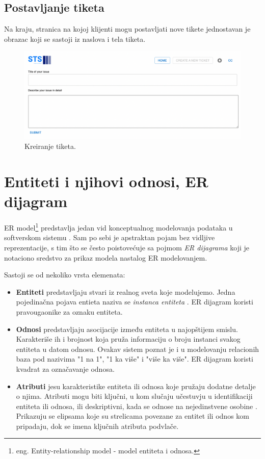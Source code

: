 \documentclass[12pt,oneside]{memoir}
\begin{document}
\newpage
\subsection{Postavljanje tiketa}

Na kraju, stranica na kojoj klijenti mogu postavljati nove tikete jednostavan je obrazac koji se sastoji iz naslova i tela tiketa.

\begin{figure}[h]
  \centering
  \includegraphics[width=1\textwidth]{docs/images/ch_1/ticket-new.png} 
  \caption{Kreiranje tiketa.}
\end{figure}

\newpage
\section{Entiteti i njihovi odnosi, ER dijagram}

ER model\footnote{eng. Entity-relationship model - model entiteta i odnosa.} predstavlja jedan vid konceptualnog modelovanja podataka u softverskom sistemu \cite{dbmodelinganddesign}. Sam po sebi je apstraktan pojam bez vidljive reprezentacije, s tim što se često poistovećuje sa pojmom \textit{ER dijagrama} koji je notaciono sredstvo za prikaz modela nastalog ER modelovanjem.

Sastoji se od nekoliko vrsta elemenata:
\begin{itemize}
    \item \textbf{Entiteti} predstavljaju stvari iz realnog sveta koje modelujemo. Jedna pojedinačna pojava entieta naziva se \textit{instanca entiteta} \cite{dbmodelinganddesign}. ER dijagram koristi pravougaonike za oznaku entiteta.
    \item \textbf{Odnosi} predstavljaju asocijacije između entiteta u najopštijem smislu. Karakteriše ih i brojnost koja pruža informaciju o broju instanci svakog entiteta u datom odnosu. Ovakav sistem poznat je i u modelovanju relacionih baza pod nazivima "1 na 1", "1 ka više" i "više ka više". ER dijagram koristi kvadrat za označavanje odnosa.
    \item \textbf{Atributi} jesu karakteristike entiteta ili odnosa koje pružaju dodatne detalje o njima. Atributi mogu biti ključni, u kom slučaju učestuvju u identifikaciji entiteta ili odnosa, ili deskriptivni, kada se odnose na nejedinstvene osobine \cite{dbmodelinganddesign}. Prikazuju se elipsama koje su strelicama povezane za entitet ili odnos kom pripadaju, dok se imena ključnih atributa podvlače.
\end{itemize}
\end{document}
